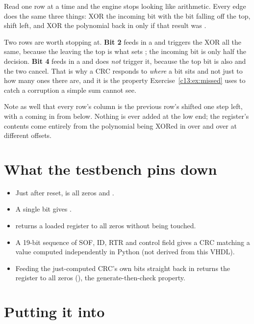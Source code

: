 Read one row at a time and the engine stops looking like arithmetic. Every edge does the same three
things: XOR the incoming bit with the bit falling off the top, shift left, and XOR the polynomial
back in only if that result was .

Two rows are worth stopping at. \textbf{Bit 2} feeds in a  and triggers the XOR all the same,
because the  leaving the top is what sets ; the incoming bit is only half the
decision. \textbf{Bit 4} feeds in a  and does \emph{not} trigger it, because the top bit is
also  and the two cancel. That is why a CRC responds to \emph{where} a bit sits and not just
to how many ones there are, and it is the property Exercise~\ref{c13:ex:missed} uses to catch a
corruption a simple sum cannot see.

Note as well that every row's  column is the previous row's  shifted one step
left, with a  coming in from below. Nothing is ever added at the low end; the register's
contents come entirely from the polynomial being XORed in over and over at different offsets.

\section{What the testbench pins down}
\label{c13:sec:tb}

\begin{itemize}
  \item Just after reset,  is all zeros and .
  \item A single  bit gives .
  \item {} returns a loaded register to all zeros without  being touched.
  \item A 19-bit sequence of SOF, ID, RTR and control field gives a CRC matching a value computed
    independently in Python (not derived from this VHDL).
  \item Feeding the just-computed CRC's own bits straight back in returns the register to all zeros
    (), the generate-then-check property.
\end{itemize}

\section{Putting it into }
\label{c13:sec:wire}

